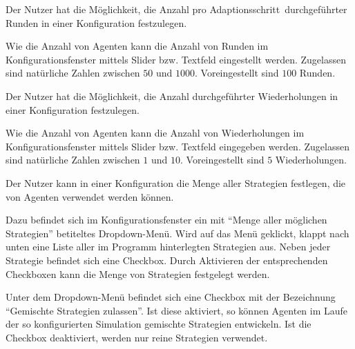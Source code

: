 \documentclass[parskip=full,11pt]{scrartcl}
\def\adapt{Adaptionsschritt}
\begin{document}
Der Nutzer hat die Möglichkeit, die Anzahl pro \adapt\ durchgeführter Runden in einer Konfiguration festzulegen.

Wie die Anzahl von Agenten kann die Anzahl von Runden im Konfigurationsfenster mittels Slider bzw. Textfeld eingestellt werden. Zugelassen sind natürliche Zahlen zwischen \(50\) und \(1000\). Voreingestellt sind \(100\) Runden.

Der Nutzer hat die Möglichkeit, die Anzahl durchgeführter Wiederholungen in einer Konfiguration festzulegen.

Wie die Anzahl von Agenten kann die Anzahl von Wiederholungen im Konfigurationsfenster mittels Slider bzw. Textfeld eingegeben werden. Zugelassen sind natürliche Zahlen zwischen \(1\) und \(10\). Voreingestellt sind \(5\) Wiederholungen.

Der Nutzer kann in einer Konfiguration die Menge aller Strategien festlegen, die von Agenten verwendet werden können.

Dazu befindet sich im Konfigurationsfenster ein mit \enquote{Menge aller möglichen Strategien} betiteltes Dropdown-Menü. Wird auf das Menü geklickt, klappt nach unten eine Liste aller im Programm hinterlegten Strategien aus. Neben jeder Strategie befindet sich eine Checkbox. Durch Aktivieren der entsprechenden Checkboxen kann die Menge von Strategien festgelegt werden.

Unter dem Dropdown-Menü befindet sich eine Checkbox mit der Bezeichnung \enquote{Gemischte Strategien zulassen}. Ist diese aktiviert, so können Agenten im Laufe der so konfigurierten Simulation gemischte Strategien entwickeln. Ist die Checkbox deaktiviert, werden nur reine Strategien verwendet.
\end{document}
